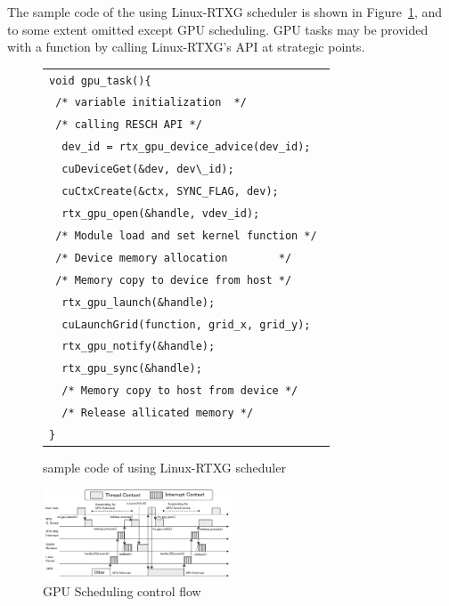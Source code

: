 The sample code of the using Linux-RTXG scheduler is shown in Figure~\ref{fig:sample},
and to some extent omitted except GPU scheduling.
GPU tasks may be provided with a function by calling Linux-RTXG's API at strategic points.

\begin{figure}[t]
\begin{center}
\begin{tabular}{l}
\hline\hline
{\scriptsize \verb|void gpu_task(){        |}\\
{\scriptsize \verb| /* variable initialization  */        |}\\
{\scriptsize \verb| /* calling RESCH API */        |}\\
{\scriptsize \verb|  dev_id = rtx_gpu_device_advice(dev_id); |}\\
{\scriptsize \verb|  cuDeviceGet(&dev, dev\_id);           |}\\
{\scriptsize \verb|  cuCtxCreate(&ctx, SYNC_FLAG, dev);    |}\\
{\scriptsize \verb|  rtx_gpu_open(&handle, vdev_id);     |}\\
{\scriptsize \verb| /* Module load and set kernel function */ |}\\
{\scriptsize \verb| /* Device memory allocation        */ |}\\
{\scriptsize \verb| /* Memory copy to device from host */ |}\\
{\scriptsize \verb|  rtx_gpu_launch(&handle); |}\\
{\scriptsize \verb|  cuLaunchGrid(function, grid_x, grid_y); |}\\
{\scriptsize \verb|  rtx_gpu_notify(&handle); |}\\
{\scriptsize \verb|  rtx_gpu_sync(&handle);   |}\\
{\scriptsize \verb|  /* Memory copy to host from device */  |}\\
{\scriptsize \verb|  /* Release allicated memory */  |}\\
{\scriptsize \verb|}|}\\
\hline\hline
\end{tabular}
\caption{sample code of using Linux-RTXG scheduler}
\label{fig:sample}
\end{center}
\end{figure}

\begin{figure}[t]
\begin{center}
\includegraphics[width=0.5\textwidth]{img/gsched_controlflow.pdf}
\caption{GPU Scheduling control flow}
\label{fig:controlflow}
\end{center}
\end{figure}


